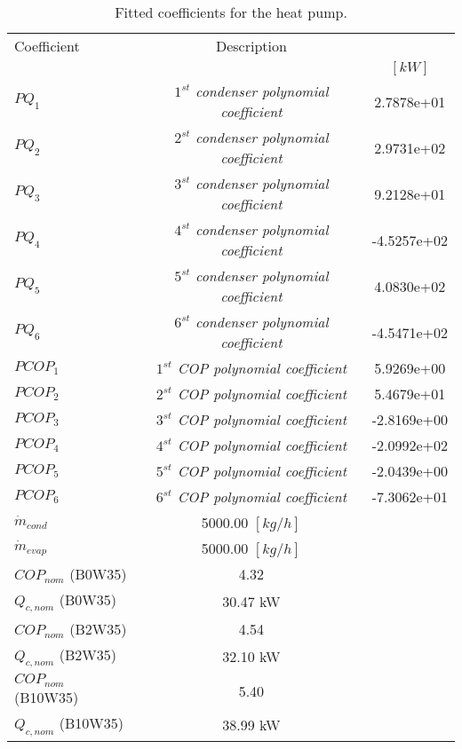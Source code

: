 \documentclass[english]{SPFShortReport}
\author{Dani Carbonell}
\begin{document}
\begin{table}[!ht]
\begin{small}
\caption{Fitted coefficients for the heat pump.}
\begin{center}
\resizebox{12cm}{!} 
{
\begin{tabular}{l | c c } 
\hline
\hline
Coefficient &Description & \\ 
 & &$[kW]$\\ 
\hline
$PQ_{1}$ & \emph{$1^{st}$ condenser polynomial coefficient}  & 2.7878e+01    \\ 
$PQ_{2}$ & \emph{$2^{st}$ condenser polynomial coefficient}  & 2.9731e+02    \\ 
$PQ_{3}$ & \emph{$3^{st}$ condenser polynomial coefficient}  & 9.2128e+01    \\ 
$PQ_{4}$ & \emph{$4^{st}$ condenser polynomial coefficient}  & -4.5257e+02    \\ 
$PQ_{5}$ & \emph{$5^{st}$ condenser polynomial coefficient}  & 4.0830e+02    \\ 
$PQ_{6}$ & \emph{$6^{st}$ condenser polynomial coefficient}  & -4.5471e+02    \\ 
\hline
$PCOP_{1}$ & \emph{$1^{st}$ COP polynomial coefficient}  & 5.9269e+00    \\ 
$PCOP_{2}$ & \emph{$2^{st}$ COP polynomial coefficient}  & 5.4679e+01    \\ 
$PCOP_{3}$ & \emph{$3^{st}$ COP polynomial coefficient}  & -2.8169e+00    \\ 
$PCOP_{4}$ & \emph{$4^{st}$ COP polynomial coefficient}  & -2.0992e+02    \\ 
$PCOP_{5}$ & \emph{$5^{st}$ COP polynomial coefficient}  & -2.0439e+00    \\ 
$PCOP_{6}$ & \emph{$6^{st}$ COP polynomial coefficient}  & -7.3062e+01    \\ 
\hline
$\dot m_{cond}$ & 5000.00 $[kg/h]$\\ 
$\dot m_{evap}$ & 5000.00 $[kg/h]$\\ 
\hline
$COP_{nom}$ (B0W35)& 4.32 \\ 
$Q_{c,nom}$ (B0W35)& 30.47 kW\\ 
$COP_{nom}$ (B2W35)& 4.54 \\ 
$Q_{c,nom}$ (B2W35)& 32.10 kW\\ 
$COP_{nom}$ (B10W35)& 5.40 \\ 
$Q_{c,nom}$ (B10W35)& 38.99 kW\\ 
\hline
\hline
\end{tabular}
}
\label{CoefTable}
\end{center}
\end{small}
\end{table}
\end{document}
